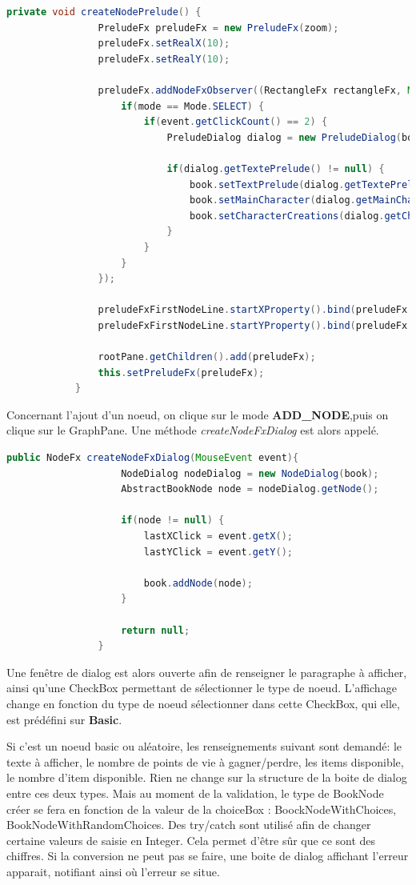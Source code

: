 			\begin{lstlisting}[gobble=12, language=java, caption=Ajout / modification du prélude]
			private void createNodePrelude() {
				PreludeFx preludeFx = new PreludeFx(zoom);
				preludeFx.setRealX(10);
				preludeFx.setRealY(10);

				preludeFx.addNodeFxObserver((RectangleFx rectangleFx, MouseEvent event) -> {
					if(mode == Mode.SELECT) {
						if(event.getClickCount() == 2) {
							PreludeDialog dialog = new PreludeDialog(book);

							if(dialog.getTextePrelude() != null) {
								book.setTextPrelude(dialog.getTextePrelude());
								book.setMainCharacter(dialog.getMainCharacter());
								book.setCharacterCreations(dialog.getCharacterCreations());
							}
						}
					}
				});

				preludeFxFirstNodeLine.startXProperty().bind(preludeFx.xProperty().add(preludeFx.widthProperty().divide(2)));
				preludeFxFirstNodeLine.startYProperty().bind(preludeFx.yProperty().add(preludeFx.heightProperty().divide(2)));

				rootPane.getChildren().add(preludeFx);
				this.setPreludeFx(preludeFx);
			}
		\end{lstlisting}


			Concernant l'ajout d'un noeud, on clique sur le mode \textbf{ADD\_NODE},puis on clique sur le GraphPane. Une méthode \textit{createNodeFxDialog} est alors appelé.

			\begin{lstlisting}[gobble=12, language=java, caption=ADD NODE()]
				public NodeFx createNodeFxDialog(MouseEvent event){
					NodeDialog nodeDialog = new NodeDialog(book);
					AbstractBookNode node = nodeDialog.getNode();

					if(node != null) {
						lastXClick = event.getX();
						lastYClick = event.getY();

						book.addNode(node);
					}

					return null;
				}
			\end{lstlisting}

			Une fenêtre de dialog est alors ouverte afin de renseigner le paragraphe à afficher, ainsi qu'une CheckBox permettant de sélectionner le type de noeud. L'affichage change en fonction du type de noeud sélectionner dans cette CheckBox, qui elle, est prédéfini sur \textbf{Basic}.

			Si c'est un noeud basic ou aléatoire, les renseignements suivant sont demandé: le texte à afficher, le nombre de points de vie à gagner/perdre, les items disponible, le nombre d'item disponible. Rien ne change sur la structure de la boite de dialog entre ces deux types. Mais au moment de la validation, le type de BookNode créer se fera en fonction de la valeur de la choiceBox : BoockNodeWithChoices, BookNodeWithRandomChoices. Des try/catch sont utilisé afin de changer certaine valeurs de saisie en Integer. Cela permet d'être sûr que ce sont des chiffres. Si la conversion ne peut pas se faire, une boite de dialog affichant l'erreur apparait, notifiant ainsi où l'erreur se situe.

